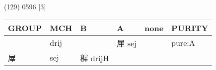 \documentclass[14pt,a4paper]{scrartcl}
\begin{document}
(129) 0596 {[}3{]}

\begin{longtable}[c]{@{}llllll@{}}
\toprule
\begin{minipage}[b]{0.14\columnwidth}\raggedright\strut
GROUP
\strut\end{minipage} &
\begin{minipage}[b]{0.14\columnwidth}\raggedright\strut
MCH
\strut\end{minipage} &
\begin{minipage}[b]{0.14\columnwidth}\raggedright\strut
B
\strut\end{minipage} &
\begin{minipage}[b]{0.14\columnwidth}\raggedright\strut
A
\strut\end{minipage} &
\begin{minipage}[b]{0.14\columnwidth}\raggedright\strut
none
\strut\end{minipage} &
\begin{minipage}[b]{0.14\columnwidth}\raggedright\strut
PURITY
\strut\end{minipage}\tabularnewline
\midrule
\endhead
\begin{minipage}[t]{0.14\columnwidth}\raggedright\strut
𡱕
\strut\end{minipage} &
\begin{minipage}[t]{0.14\columnwidth}\raggedright\strut
drij
\strut\end{minipage} &
\begin{minipage}[t]{0.14\columnwidth}\raggedright\strut
\strut\end{minipage} &
\begin{minipage}[t]{0.14\columnwidth}\raggedright\strut
犀 sej
\strut\end{minipage} &
\begin{minipage}[t]{0.14\columnwidth}\raggedright\strut
\strut\end{minipage} &
\begin{minipage}[t]{0.14\columnwidth}\raggedright\strut
pure:A
\strut\end{minipage}\tabularnewline
\begin{minipage}[t]{0.14\columnwidth}\raggedright\strut
屖
\strut\end{minipage} &
\begin{minipage}[t]{0.14\columnwidth}\raggedright\strut
sej
\strut\end{minipage} &
\begin{minipage}[t]{0.14\columnwidth}\raggedright\strut
穉 drijH
\strut\end{minipage} &

\end{longtable}
\end{document}
